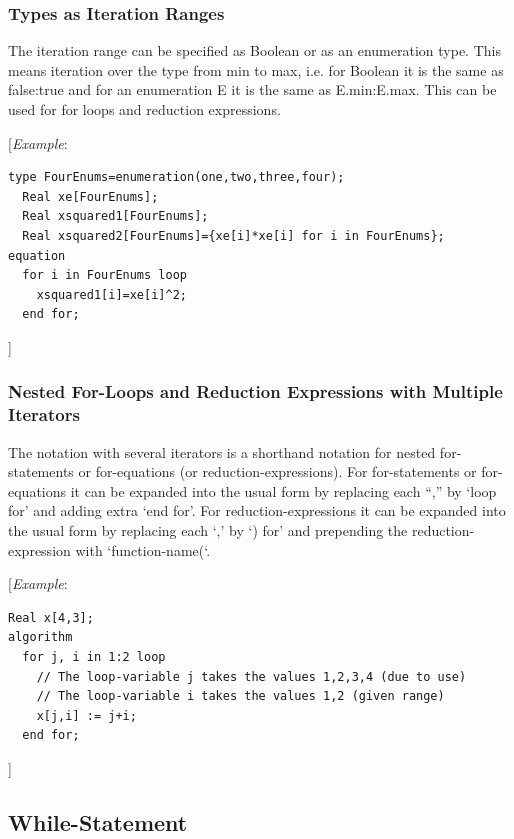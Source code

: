 \documentclass[10pt,a4paper]{report}
\def\doublelabel#1{\label{#1}}
\begin{document}
\subsubsection{Types as Iteration Ranges }\doublelabel{types-as-iteration-ranges}

The iteration range can be specified as Boolean or as an enumeration
type. This means iteration over the type from min to max, i.e. for
Boolean it is the same as false:true and for an enumeration E it is the
same as E.min:E.max. This can be used for for loops and reduction
expressions.

{[}\emph{Example}:

\begin{lstlisting}[language=modelica]
  type FourEnums=enumeration(one,two,three,four);
  Real xe[FourEnums];
  Real xsquared1[FourEnums];
  Real xsquared2[FourEnums]={xe[i]*xe[i] for i in FourEnums};
equation
  for i in FourEnums loop
    xsquared1[i]=xe[i]^2;
  end for;
\end{lstlisting}
{]}

\subsubsection{Nested For-Loops and Reduction Expressions with Multiple Iterators}\doublelabel{nested-for-loops-and-reduction-expressions-with-multiple-iterators}

The notation with several iterators is a shorthand notation for nested
for-statements or for-equations (or reduction-expressions). For
for-statements or for-equations it can be expanded into the usual form
by replacing each ``,'' by `loop for' and adding extra `end for'. For
reduction-expressions it can be expanded into the usual form by
replacing each `,' by `) for' and prepending the reduction-expression
with `function-name(`.

{[}\emph{Example}:

\begin{lstlisting}[language=modelica]
  Real x[4,3];
algorithm
  for j, i in 1:2 loop
    // The loop-variable j takes the values 1,2,3,4 (due to use)
    // The loop-variable i takes the values 1,2 (given range)
    x[j,i] := j+i;
  end for;
\end{lstlisting}
{]}

\subsection{While-Statement}\doublelabel{while-statement}
\end{document}
